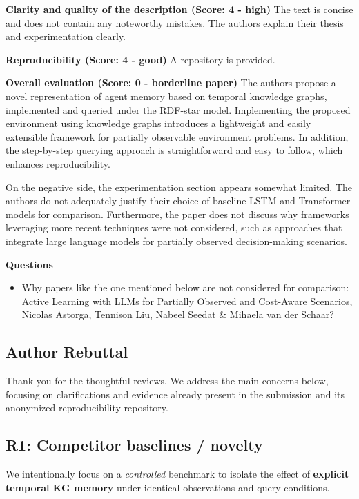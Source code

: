 \documentclass[runningheads]{llncs}
\begin{document}
\textbf{Clarity and quality of the description (Score: 4 - high)} \quad The text is concise and does not contain any noteworthy mistakes. The authors explain their thesis and experimentation clearly.

\textbf{Reproducibility (Score: 4 - good)} \quad A repository is provided.

\textbf{Overall evaluation (Score: 0 - borderline paper)} \quad The authors propose a novel representation of agent memory based on temporal knowledge graphs, implemented and queried under the RDF-star model. Implementing the proposed environment using knowledge graphs introduces a lightweight and easily extensible framework for partially observable environment problems. In addition, the step-by-step querying approach is straightforward and easy to follow, which enhances reproducibility.

On the negative side, the experimentation section appears somewhat limited. The authors do not adequately justify their choice of baseline LSTM and Transformer models for comparison. Furthermore, the paper does not discuss why frameworks leveraging more recent techniques were not considered, such as approaches that integrate large language models for partially observed decision-making scenarios.

\textbf{Questions}
\begin{itemize}
  \item Why papers like the one mentioned below are not considered for comparison: Active Learning with LLMs for Partially Observed and Cost-Aware Scenarios, Nicolas Astorga, Tennison Liu, Nabeel Seedat \& Mihaela van der Schaar?
\end{itemize}

\subsection*{Author Rebuttal}

Thank you for the thoughtful reviews. We address the main concerns below, focusing on clarifications and evidence already present in the submission and its anonymized reproducibility repository.

\subsection*{R1: Competitor baselines / novelty}

We intentionally focus on a \emph{controlled} benchmark to isolate the effect of \textbf{explicit temporal KG memory} under identical observations and query conditions.
\end{document}
